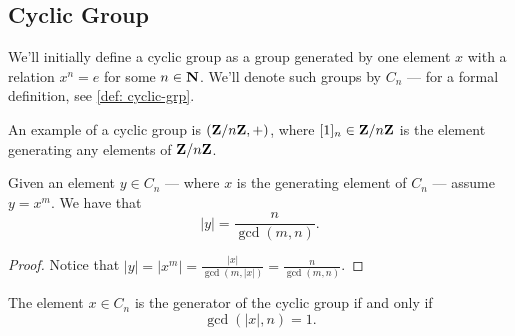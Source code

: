 \subsection{Cyclic Group}

We'll initially define a cyclic group as a group generated by one element \(x\)
with a relation \(x^n = e\) for some \(n \in \mathbf{N}\). We'll denote such groups by
\(C_n\) --- for a formal definition, see \cref{def: cyclic-grp}.

\begin{example}
An example of a cyclic group is \((\mathbf{Z}/n\mathbf{Z}, +)\), where \([1]_n \in \mathbf{Z}/n\mathbf{Z}\) is
the element generating any elements of \(\mathbf{Z}/n\mathbf{Z}\).
\end{example}

\begin{proposition}\label{prop: ord-cyclic-elem}
Given an element \(y \in C_n\) --- where \(x\) is the generating element of
\(C_n\) --- assume \(y = x^m\). We have that
\[
  |y| = \frac n {\operatorname{gcd}(m, n)}.
\]
\end{proposition}

\begin{proof}
Notice that \(|y| = |x^m| = \frac{|x|}{\operatorname{gcd}(m, |x|)} = \frac n
{\operatorname{gcd}(m, n)}\).
\end{proof}

\begin{corollary}
The element \(x \in C_n\) is the generator of the cyclic group if and only if
\[
  \operatorname{gcd}(|x|, n) = 1.
\]
\end{corollary}
